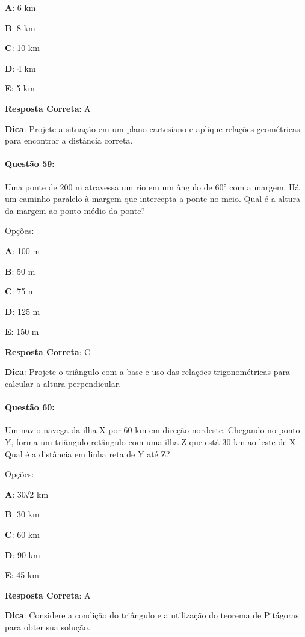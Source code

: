 \documentclass{article}
\begin{document}
\vspace{\baselineskip}\textbf{A}: 6 km 

\textbf{B}: 8 km 

\textbf{C}: 10 km 

\textbf{D}: 4 km 

\textbf{E}: 5 km 

\vspace{\baselineskip}\textbf{Resposta Correta}: A

\vspace{\baselineskip}\textbf{Dica}: Projete a situação em um plano cartesiano e aplique relações geométricas para encontrar a distância correta.

\paragraph{Questão 59:}
{Uma ponte de 200 m atravessa um rio em um ângulo de 60° com a margem. Há um caminho paralelo à margem que intercepta a ponte no meio. Qual é a altura da margem ao ponto médio da ponte?}

\vspace{\baselineskip}Opções:

\vspace{\baselineskip}\textbf{A}: 100 m 

\textbf{B}: 50 m 

\textbf{C}: 75 m 

\textbf{D}: 125 m 

\textbf{E}: 150 m 

\vspace{\baselineskip}\textbf{Resposta Correta}: C

\vspace{\baselineskip}\textbf{Dica}: Projete o triângulo com a base e uso das relações trigonométricas para calcular a altura perpendicular.

\paragraph{Questão 60:}
{Um navio navega da ilha X por 60 km em direção nordeste. Chegando no ponto Y, forma um triângulo retângulo com uma ilha Z que está 30 km ao leste de X. Qual é a distância em linha reta de Y até Z?}

\vspace{\baselineskip}Opções:

\vspace{\baselineskip}\textbf{A}: 30√2 km 

\textbf{B}: 30 km 

\textbf{C}: 60 km 

\textbf{D}: 90 km 

\textbf{E}: 45 km 

\vspace{\baselineskip}\textbf{Resposta Correta}: A

\vspace{\baselineskip}\textbf{Dica}: Considere a condição do triângulo e a utilização do teorema de Pitágoras para obter sua solução.
\end{document}
